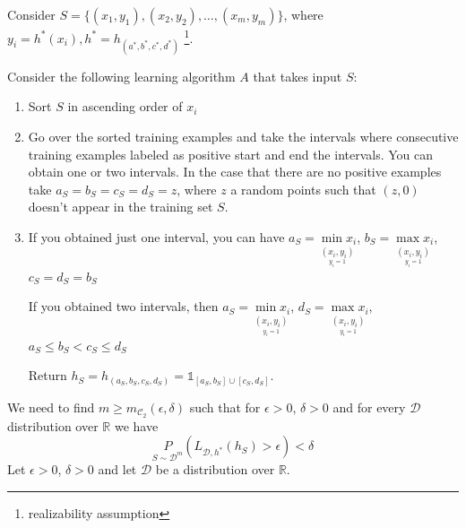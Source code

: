 \documentclass{article}
\newcommand{\<}{\langle}
\renewcommand{\>}{\rangle}
\theoremstyle{definition}
\def\gC{{\mathcal{C}}}
\def\gD{{\mathcal{D}}}
\def\sR{{\mathbb{R}}}
\def\sone{{\mathds{1}}}
\newcommand{\uset}{\underset}
\def\sone{{\mathds{1}}}
\newcommand{\uset}{\underset}
\begin{document}
Consider $S = \{(x_1, y_1), (x_2, y_2), \dots, (x_m, y_m)\}$, where ${y_i = h^*(x_i), h^* = h_{(a^*, b^*, c^*, d^*)}}$ \footnote{realizability assumption}.

\begin{figure}[h]
\centering
{}
\end{figure}

Consider the following learning algorithm $A$ that takes input $S$:
\begin{enumerate}[label=\roman*)]
  \item Sort $S$ in ascending order of $x_i$
  \item Go over the sorted training examples and take the intervals where consecutive training
        examples labeled as positive start and end the intervals.
        You can obtain one or two intervals. In the case that there are no positive examples take $a_S = b_S = c_S = d_S = z$, where $z$ a random points such that $(z,0)$ doesn't appear in the training set $S$.
  \item If you obtained just one interval, you can have
    $a_S = \uset{\uset{y_i = 1}{(x_i, y_i)}}{\min x_i}$,  %
    $b_S = \uset{\uset{y_i = 1}{(x_i, y_i)}}{\max x_i}$,
    $c_S = d_S = b_S$
    
    If you obtained two intervals, then
    $a_S = \uset{\uset{y_i = 1}{(x_i, y_i)}}{\min x_i}$,
    $d_S = \uset{\uset{y_i = 1}{(x_i, y_i)}}{\max x_i}$,
    $a_S \leq b_S < c_S \leq d_S$
    
    Return $h_S = h_{(a_S, b_S, c_S, d_S)} = \sone_{[a_S, b_S] \cup [c_S, d_S]}$.
\end{enumerate}
We need to find $m \geq m_{\gC_2}(\epsilon, \delta)$ such that for $\epsilon > 0$, $\delta > 0$
and for every $\gD$ distribution over $\sR$ we have
\begin{equation*}
  \uset{S \sim \gD^m}{P}(L_{\gD, h^*}(h_S) > \epsilon) < \delta
\end{equation*}
Let $\epsilon > 0$, $\delta > 0$ and let $\gD$ be a distribution over $\sR$.
 
\end{document}
